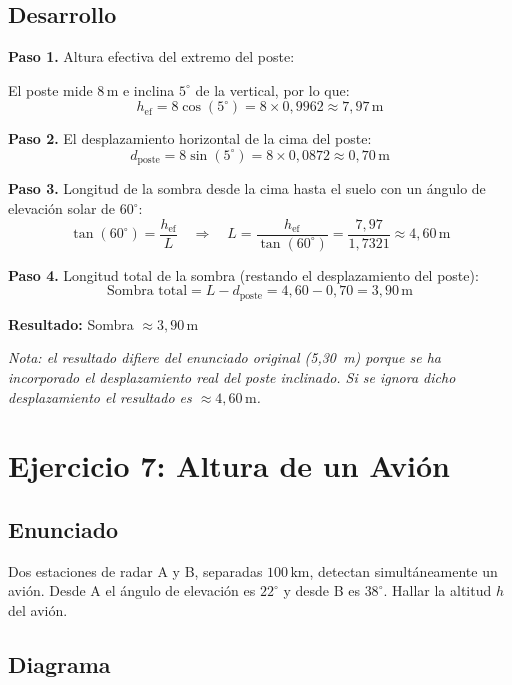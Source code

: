 \documentclass[11pt, letterpaper]{article}
\begin{document}
\subsection*{Desarrollo}

\textbf{Paso 1.} Altura efectiva del extremo del poste:

El poste mide \(8\,\text{m}\) e inclina \(5^\circ\) de la vertical, por lo que:
\[
  h_{\text{ef}} = 8\cos(5^\circ) = 8 \times 0{,}9962 \approx 7{,}97\,\text{m}
\]

\textbf{Paso 2.} El desplazamiento horizontal de la cima del poste:
\[
  d_{\text{poste}} = 8\sin(5^\circ) = 8 \times 0{,}0872 \approx 0{,}70\,\text{m}
\]

\textbf{Paso 3.} Longitud de la sombra desde la cima hasta el suelo
con un ángulo de elevación solar de \(60^\circ\):
\[
  \tan(60^\circ) = \frac{h_{\text{ef}}}{L}
  \quad\Longrightarrow\quad
  L = \frac{h_{\text{ef}}}{\tan(60^\circ)} = \frac{7{,}97}{1{,}7321} \approx 4{,}60\,\text{m}
\]

\textbf{Paso 4.} Longitud total de la sombra (restando el desplazamiento del poste):
\[
  \text{Sombra total} = L - d_{\text{poste}} = 4{,}60 - 0{,}70 = 3{,}90\,\text{m}
\]

\begin{resultbox}
\textbf{Resultado:} \quad Sombra \(\approx 3{,}90\,\text{m}\)

\small\textit{Nota: el resultado difiere del enunciado original (5,30~m) porque se ha incorporado
el desplazamiento real del poste inclinado. Si se ignora dicho desplazamiento el resultado es
\(\approx 4{,}60\,\text{m}\).}
\end{resultbox}

\newpage
\section{Ejercicio 7: Altura de un Avión}

\subsection*{Enunciado}
Dos estaciones de radar A y B, separadas \(100\,\text{km}\), detectan
simultáneamente un avión. Desde A el ángulo de elevación es \(22^\circ\) y
desde B es \(38^\circ\). Hallar la altitud \(h\) del avión.

\subsection*{Diagrama}
\end{document}
